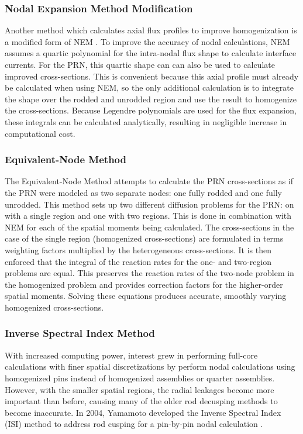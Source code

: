 \subsubsection{Nodal Expansion Method Modification}\label{sss:NEMmod}

Another method which calculates axial flux profiles to improve homogenization is a modified form of NEM \cite{de2012NEMmodification,martinez1999NEMmodOrig}.  To improve the accuracy of nodal calculations, NEM assumes a quartic polynomial for the intra-nodal flux shape to calculate interface currents.  For the PRN, this quartic shape can can also be used to calculate improved cross-sections.  This is convenient because this axial profile must already be calculated when using NEM, so the only additional calculation is to integrate the shape over the rodded and unrodded region and use the result to homogenize the cross-sections.  Because Legendre polynomials are used for the flux expansion, these integrals can be calculated analytically, resulting in negligible increase in computational cost.

\subsubsection{Equivalent-Node Method}

The Equivalent-Node Method \cite{dall2002nodeEquivalenceDecusping} attempts to calculate the PRN cross-sections as if the PRN were modeled as two separate nodes: one fully rodded and one fully unrodded.  This method sets up two different diffusion problems for the PRN: on with a single region and one with two regions.  This is done in combination with NEM for each of the spatial moments being calculated.  The cross-sections in the case of the single region (homogenized cross-sections) are formulated in terms weighting factors multiplied by the heterogeneous cross-sections.  It is then enforced that the integral of the reaction rates for the one- and two-region problems are equal.  This preserves the reaction rates of the two-node problem in the homogenized problem and provides correction factors for the higher-order spatial moments.  Solving these equations produces accurate, smoothly varying homogenized cross-sections.

\subsubsection{Inverse Spectral Index Method}

With increased computing power, interest grew in performing full-core calculations with finer spatial discretizations by perform nodal calculations using homogenized pins instead of homogenized assemblies or quarter assemblies.  However, with the smaller spatial regions, the radial leakages become more important than before, causing many of the older rod decusping methods to become inaccurate.  In 2004, Yamamoto developed the Inverse Spectral Index (ISI) method to address rod cusping for a pin-by-pin nodal calculation \cite{yamamoto2004pinByPinNodalDecusping}.

